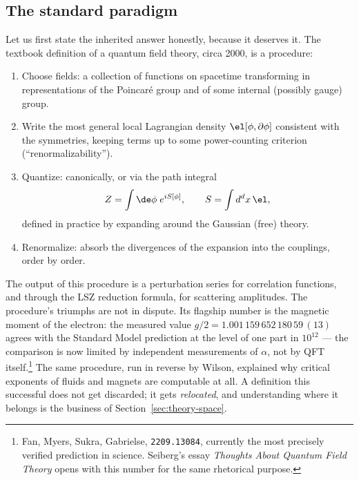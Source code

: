 \subsection{The standard paradigm}
\label{sec:standard-paradigm}

Let us first state the inherited answer honestly, because it deserves it. The
textbook definition of a quantum field theory, circa 2000, is a procedure:

\begin{enumerate}
\item Choose fields: a collection of functions on spacetime transforming in
representations of the Poincar\'e group and of some internal (possibly gauge)
group.
\item Write the most general local Lagrangian density $\el[\phi, \partial\phi]$
consistent with the symmetries, keeping terms up to some power-counting
criterion (``renormalizability'').
\item Quantize: canonically, or via the path integral
\begin{equation}
Z = \int \de\phi \; e^{iS[\phi]}, \qquad S = \int d^dx \, \el ,
\label{eq:formal-pi}
\end{equation}
defined in practice by expanding around the Gaussian (free) theory.
\item Renormalize: absorb the divergences of the expansion into the couplings,
order by order.
\end{enumerate}

\noin The output of this procedure is a perturbation series for correlation
functions, and through the LSZ reduction formula, for scattering
amplitudes. The procedure's triumphs are not in dispute. Its flagship
number is the magnetic moment of the electron: the measured value $g/2 =
1.001\,159\,652\,180\,59\,(13)$ agrees with the Standard Model prediction
at the level of one part in $10^{12}$ --- the comparison is now limited by
independent measurements of $\alpha$, not by QFT itself.\footnote{Fan,
Myers, Sukra, Gabrielse, \texttt{2209.13084}, currently the most precisely
verified prediction in science. Seiberg's essay \emph{Thoughts About
Quantum Field Theory} opens with this number for the same rhetorical
purpose.} The same procedure, run in reverse by Wilson, explained why
critical exponents of fluids and magnets are computable at all. A
definition this successful does not get discarded; it gets
\emph{relocated}, and understanding where it belongs is the business of
Section~\ref{sec:theory-space}.

